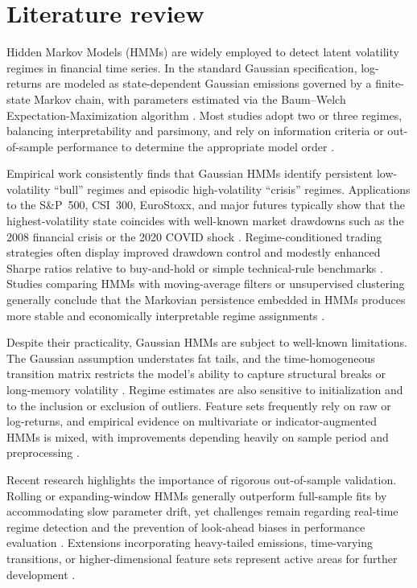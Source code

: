 \documentclass[a4paper,fleqn]{cas-dc} %
\begin{document}
\section{Literature review}

Hidden Markov Models (HMMs) are widely employed to detect latent volatility regimes in financial time series. In the standard Gaussian specification, log-returns are modeled as state-dependent Gaussian emissions governed by a finite-state Markov chain, with parameters estimated via the Baum--Welch Expectation-Maximization algorithm \cite{Rabiner1989, Holzmann2016}. Most studies adopt two or three regimes, balancing interpretability and parsimony, and rely on information criteria or out-of-sample performance to determine the appropriate model order \cite{Chen2020}.

Empirical work consistently finds that Gaussian HMMs identify persistent low-volatility ``bull'' regimes and episodic high-volatility ``crisis'' regimes. Applications to the S\&P~500, CSI~300, EuroStoxx, and major futures typically show that the highest-volatility state coincides with well-known market drawdowns such as the 2008 financial crisis or the 2020 COVID shock \cite{Wang2017, Duriez2025, Liu2017}. Regime-conditioned trading strategies often display improved drawdown control and modestly enhanced Sharpe ratios relative to buy-and-hold or simple technical-rule benchmarks \cite{Wang2020, Duriez2025}. Studies comparing HMMs with moving-average filters or unsupervised clustering generally conclude that the Markovian persistence embedded in HMMs produces more stable and economically interpretable regime assignments \cite{Ansari2025, LSEG2023}.

Despite their practicality, Gaussian HMMs are subject to well-known limitations. The Gaussian assumption understates fat tails, and the time-homogeneous transition matrix restricts the model's ability to capture structural breaks or long-memory volatility \cite{Ansari2025}. Regime estimates are also sensitive to initialization and to the inclusion or exclusion of outliers. Feature sets frequently rely on raw or log-returns, and empirical evidence on multivariate or indicator-augmented HMMs is mixed, with improvements depending heavily on sample period and preprocessing \cite{Chen2020, QuantConnect2023}.

Recent research highlights the importance of rigorous out-of-sample validation. Rolling or expanding-window HMMs generally outperform full-sample fits by accommodating slow parameter drift, yet challenges remain regarding real-time regime detection and the prevention of look-ahead biases in performance evaluation \cite{Duriez2025, Ansari2025}. Extensions incorporating heavy-tailed emissions, time-varying transitions, or higher-dimensional feature sets represent active areas for further development \cite{Wang2020, LSEG2023}.
\end{document}

